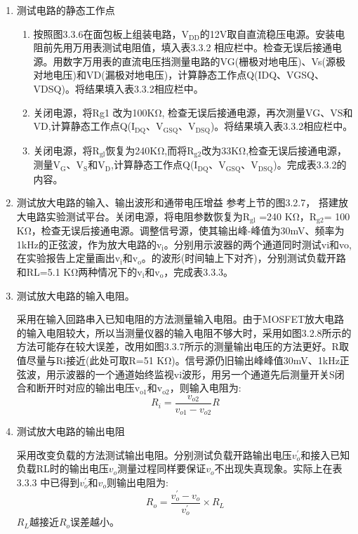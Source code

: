 \documentclass[a4paper]{article}
\theoremstyle{definition}
\theoremstyle{plain}
\theoremstyle{remark}
\begin{document}
\begin{enumerate}
	\item 测试电路的静态工作点
	      \begin{enumerate}[label=(\arabic*)]
		      \item 按照图3.3.6在面包板上组装电路，$\mathrm{V_{DD}}$的12V取自直流稳压电源。安装电阻前先用万用表测试电阻值，填入表3.3.2 相应栏中。检查无误后接通电源。用数字万用表的直流电压挡测量电路的VG(栅极对地电压)、Vs(源极对地电压)和VD(漏极对地电压)，计算静态工作点Q(IDQ、VGSQ、VDSQ)。将结果填入表3.3.2相应栏中。
		      \item 关闭电源，将Rg1 改为100KΩ, 检查无误后接通电源，再次测量VG、VS和VD,计算静态工作点Q($\mathrm{I_{DQ}}$、$\mathrm{V_{GSQ}}$、$\mathrm{V_{DSQ}}$)。将结果填入表3.3.2相应栏中。
		      \item 关闭电源，将$\mathrm{R_{gl}}$恢复为240KΩ,而将$\mathrm{R_{g2}}$改为33KΩ,检查无误后接通电源，测量$\mathrm{V_G}$、$\mathrm{V_S}$和$\mathrm{V_D}$,计算静态工作点Q($\mathrm{I_{DQ}}$、$\mathrm{V_{GSQ}}$、$\mathrm{V_{DSQ}}$)。完成表3.3.2的内容。
	      \end{enumerate}

	\item 测试放大电路的输入、输出波形和通带电压增益
	      参考上节的图3.2.7， 搭建放大电路实验测试平台。关闭电源，将电阻参数恢复为$\mathrm{R_{gl}}$ =240 KΩ，$\mathrm{R_{g2}}$= 100 KΩ，检查无误后接通电源。调整信号源，使其输出峰-峰值为30mV、频率为1kHz的正弦波，作为放大电路的$\mathrm{v_i}$。分别用示波器的两个通道同时测试vi和vo,在实验报告上定量画出$\mathrm{v_i}$和$\mathrm{v_o}$。的波形(时间轴上下对齐)，分别测试负载开路和RL=5.1 KΩ两种情况下的$\mathrm{v_i}$和$\mathrm{v_o}$，完成表3.3.3。

	\item 测试放大电路的输入电阻。

	      采用在输入回路串入已知电阻的方法测量输入电阻。由于MOSFET放大电路的输入电阻较大，所以当测量仪器的输入电阻不够大时，采用如图3.2.8所示的方法可能存在较大误差，改用如图3.3.7所示的测量输出电压的方法更好。R取值尽量与Ri接近(此处可取R=51 KΩ)。信号源仍旧输出峰峰值30mV、1kHz正弦波，用示波器的一个通道始终监视vi波形，用另一个通道先后测量开关S闭合和断开时对应的输出电压$\mathrm{v_{o1}}$和$\mathrm{v_{o2}}$，则输入电阻为:
	      \begin{equation}
		      R_i=\frac{v_{o2}}{v_{o1}-v_{o2}}R
	      \end{equation}
	\item 测试放大电路的输出电阻

	      采用改变负载的方法测试输出电阻。分别测试负载开路输出电压$v^{'}_{o}$和接入已知负载RL时的输出电压$v_o$测量过程同样要保证$v_o$不出现失真现象。实际上在表3.3.3 中已得到$v^{'}_{o}$和$v_o$则输出电阻为:
	      \begin{equation}
		      R_o = \frac{v^{'}_{o}-v_o}{v^{'}_{o}}\times R_L
	      \end{equation}
	      $R_L$越接近$R_o$误差越小。


\end{enumerate}
\end{document}
